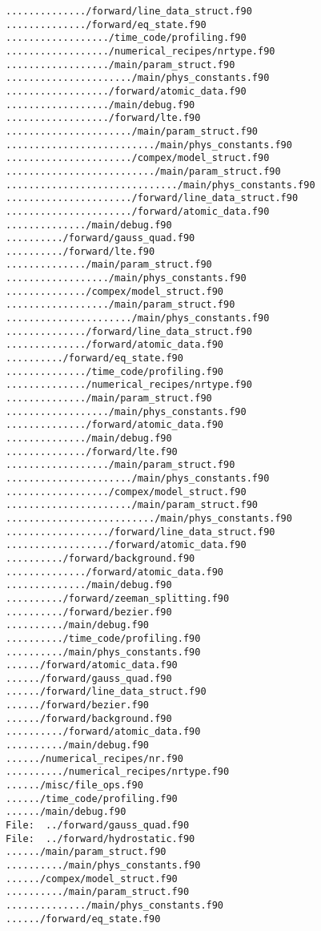 \begin{verbatim}
............../forward/line_data_struct.f90
............../forward/eq_state.f90
................../time_code/profiling.f90
................../numerical_recipes/nrtype.f90
................../main/param_struct.f90
....................../main/phys_constants.f90
................../forward/atomic_data.f90
................../main/debug.f90
................../forward/lte.f90
....................../main/param_struct.f90
........................../main/phys_constants.f90
....................../compex/model_struct.f90
........................../main/param_struct.f90
............................../main/phys_constants.f90
....................../forward/line_data_struct.f90
....................../forward/atomic_data.f90
............../main/debug.f90
........../forward/gauss_quad.f90
........../forward/lte.f90
............../main/param_struct.f90
................../main/phys_constants.f90
............../compex/model_struct.f90
................../main/param_struct.f90
....................../main/phys_constants.f90
............../forward/line_data_struct.f90
............../forward/atomic_data.f90
........../forward/eq_state.f90
............../time_code/profiling.f90
............../numerical_recipes/nrtype.f90
............../main/param_struct.f90
................../main/phys_constants.f90
............../forward/atomic_data.f90
............../main/debug.f90
............../forward/lte.f90
................../main/param_struct.f90
....................../main/phys_constants.f90
................../compex/model_struct.f90
....................../main/param_struct.f90
........................../main/phys_constants.f90
................../forward/line_data_struct.f90
................../forward/atomic_data.f90
........../forward/background.f90
............../forward/atomic_data.f90
............../main/debug.f90
........../forward/zeeman_splitting.f90
........../forward/bezier.f90
........../main/debug.f90
........../time_code/profiling.f90
........../main/phys_constants.f90
....../forward/atomic_data.f90
....../forward/gauss_quad.f90
....../forward/line_data_struct.f90
....../forward/bezier.f90
....../forward/background.f90
........../forward/atomic_data.f90
........../main/debug.f90
....../numerical_recipes/nr.f90
........../numerical_recipes/nrtype.f90
....../misc/file_ops.f90
....../time_code/profiling.f90
....../main/debug.f90
File:  ../forward/gauss_quad.f90
File:  ../forward/hydrostatic.f90
....../main/param_struct.f90
........../main/phys_constants.f90
....../compex/model_struct.f90
........../main/param_struct.f90
............../main/phys_constants.f90
....../forward/eq_state.f90

\end{verbatim}
